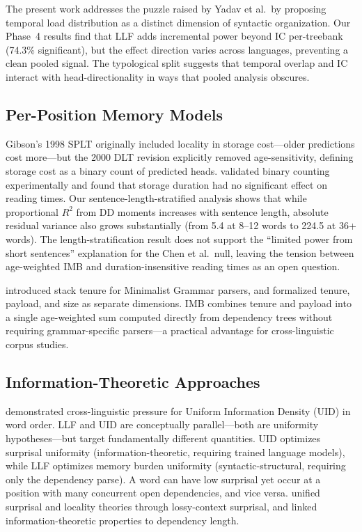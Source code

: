 \documentclass[11pt,letterpaper]{article}
\begin{document}
The present work addresses the puzzle raised by Yadav et al.\ by proposing temporal load distribution as a distinct dimension of syntactic organization. Our Phase~4 results find that LLF adds incremental power beyond IC per-treebank (74.3\% significant), but the effect direction varies across languages, preventing a clean pooled signal. The typological split suggests that temporal overlap and IC interact with head-directionality in ways that pooled analysis obscures.

\subsection{Per-Position Memory Models}

Gibson's 1998 SPLT \citep{Gibson1998} originally included locality in storage cost---older predictions cost more---but the 2000 DLT revision \citep{Gibson2000} explicitly removed age-sensitivity, defining storage cost as a binary count of predicted heads. \citet{Chen2005} validated binary counting experimentally and found that storage duration had no significant effect on reading times. Our sentence-length-stratified analysis shows that while proportional $R^2$ from DD moments increases with sentence length, absolute residual variance also grows substantially (from 5.4 at 8--12 words to 224.5 at 36+ words). The length-stratification result does not support the ``limited power from short sentences'' explanation for the Chen et al.\ null, leaving the tension between age-weighted IMB and duration-insensitive reading times as an open question.

\citet{Kobele2013} introduced stack tenure for Minimalist Grammar parsers, and \citet{Graf2017} formalized tenure, payload, and size as separate dimensions. IMB combines tenure and payload into a single age-weighted sum computed directly from dependency trees without requiring grammar-specific parsers---a practical advantage for cross-linguistic corpus studies.

\subsection{Information-Theoretic Approaches}

\citet{Clark2023} demonstrated cross-linguistic pressure for Uniform Information Density (UID) in word order. LLF and UID are conceptually parallel---both are uniformity hypotheses---but target fundamentally different quantities. UID optimizes surprisal uniformity (information-theoretic, requiring trained language models), while LLF optimizes memory burden uniformity (syntactic-structural, requiring only the dependency parse). A word can have low surprisal yet occur at a position with many concurrent open dependencies, and vice versa. \citet{Futrell2020a} unified surprisal and locality theories through lossy-context surprisal, and \citet{Xu2024} linked information-theoretic properties to dependency length.
\end{document}
